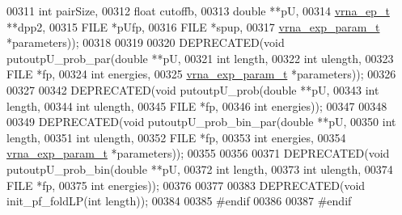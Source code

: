 \begin{DoxyCode}
00311                                       \textcolor{keywordtype}{int}               pairSize,
00312                                       \textcolor{keywordtype}{float}             cutoffb,
00313                                       \textcolor{keywordtype}{double}            **pU,
00314                                       \hyperlink{group__struct__utils_structvrna__elem__prob__s}{vrna\_ep\_t}         **dpp2,
00315                                       FILE              *pUfp,
00316                                       FILE              *spup,
00317                                       \hyperlink{group__energy__parameters_structvrna__exp__param__s}{vrna\_exp\_param\_t}  *parameters));
00318 
00319 
00320 DEPRECATED(\textcolor{keywordtype}{void} putoutpU\_prob\_par(\textcolor{keywordtype}{double}            **pU,
00321                                   \textcolor{keywordtype}{int}               length,
00322                                   \textcolor{keywordtype}{int}               ulength,
00323                                   FILE              *fp,
00324                                   \textcolor{keywordtype}{int}               energies,
00325                                   \hyperlink{group__energy__parameters_structvrna__exp__param__s}{vrna\_exp\_param\_t}  *parameters));
00326 
00327 
00342 DEPRECATED(\textcolor{keywordtype}{void}    putoutpU\_prob(\textcolor{keywordtype}{double} **pU,
00343                                  \textcolor{keywordtype}{int}    length,
00344                                  \textcolor{keywordtype}{int}    ulength,
00345                                  FILE   *fp,
00346                                  \textcolor{keywordtype}{int}    energies));
00347 
00348 
00349 DEPRECATED(\textcolor{keywordtype}{void} putoutpU\_prob\_bin\_par(\textcolor{keywordtype}{double}            **pU,
00350                                       \textcolor{keywordtype}{int}               length,
00351                                       \textcolor{keywordtype}{int}               ulength,
00352                                       FILE              *fp,
00353                                       \textcolor{keywordtype}{int}               energies,
00354                                       \hyperlink{group__energy__parameters_structvrna__exp__param__s}{vrna\_exp\_param\_t}  *parameters));
00355 
00356 
00371 DEPRECATED(\textcolor{keywordtype}{void}    putoutpU\_prob\_bin(\textcolor{keywordtype}{double} **pU,
00372                                      \textcolor{keywordtype}{int}    length,
00373                                      \textcolor{keywordtype}{int}    ulength,
00374                                      FILE   *fp,
00375                                      \textcolor{keywordtype}{int}    energies));
00376 
00377 
00383 DEPRECATED(\textcolor{keywordtype}{void} init\_pf\_foldLP(\textcolor{keywordtype}{int} length));
00384 
00385 \textcolor{preprocessor}{#endif}
00386 
00387 \textcolor{preprocessor}{#endif}
\end{DoxyCode}
